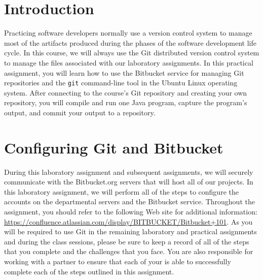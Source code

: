 


\usepackage[compact]{titlesec}



% 

\section*{Introduction}

Practicing software developers normally use a version control system to manage most of the artifacts produced during the
phases of the software development life cycle.  In this course, we will always use the Git distributed version control
system to manage the files associated with our laboratory assignments.  In this practical assignment, you will learn how
to use the Bitbucket service for managing Git repositories and the {\tt git} command-line tool in the Ubuntu Linux
operating system. After connecting to the course's Git repository and creating your own repository, you will compile and
run one Java program, capture the program's output, and commit your output to a repository.

\section*{Configuring Git and Bitbucket}

During this laboratory assignment and subsequent assignments, we will securely communicate with the Bitbucket.org
servers that will host all of our projects.  In this laboratory assignment, we will perform all of the steps to
configure the accounts on the departmental servers and the Bitbucket service.  Throughout the assignment, you should
refer to the following Web site for additional information:
\url{https://confluence.atlassian.com/display/BITBUCKET/Bitbucket+101}.  As you will be required to use Git in the
remaining laboratory and practical assignments and during the class sessions, please be sure to keep a record of all of
the steps that you complete and the challenges that you face.  You are also responsible for working with a partner to
ensure that each of your is able to successfully complete each of the steps outlined in this assignment.

